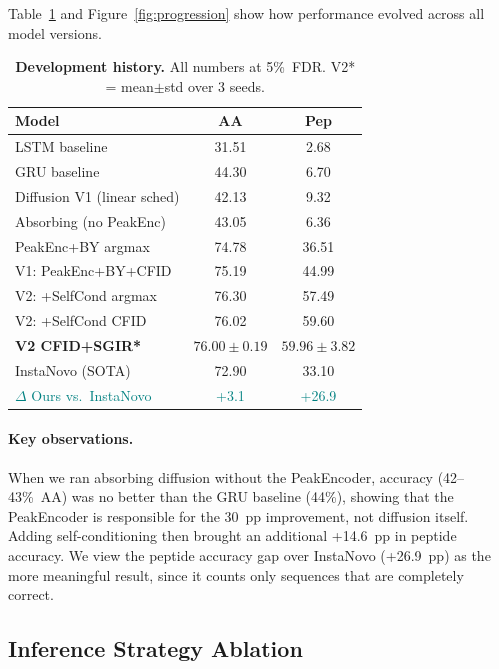 \documentclass[10pt,twocolumn]{article}
\begin{document}
Table~\ref{tab:main} and Figure~\ref{fig:progression} show how performance evolved across all model versions.

\begin{table}[t]
  \centering
  \caption{
    \textbf{Development history.}
    All numbers at 5\%~FDR.
    V2* = mean$\pm$std over 3 seeds.
  }
  \label{tab:main}
  \setlength{\tabcolsep}{4pt}
  \small
  \begin{tabular}{lcc}
    \toprule
    Model & AA & Pep \\
    \midrule
    LSTM baseline               & 31.51 & 2.68  \\
    GRU baseline                & 44.30 & 6.70  \\
    Diffusion V1 (linear sched) & 42.13 & 9.32  \\
    Absorbing (no PeakEnc)      & 43.05 & 6.36  \\
    \midrule
    PeakEnc+BY argmax           & 74.78 & 36.51 \\
    V1: PeakEnc+BY+CFID         & 75.19 & 44.99 \\
    \midrule
    V2: +SelfCond argmax        & 76.30 & 57.49 \\
    V2: +SelfCond CFID          & 76.02 & 59.60 \\
    \rowcolor{green!10}
    \textbf{V2 CFID+SGIR*}      & $76.00{\pm}0.19$ & $59.96{\pm}3.82$ \\
    \midrule
    InstaNovo (SOTA)            & 72.90 & 33.10 \\
    \textcolor{teal}{$\Delta$ Ours vs.\ InstaNovo} & \textcolor{teal}{+3.1} & \textcolor{teal}{+26.9} \\
    \bottomrule
  \end{tabular}
\end{table}

\paragraph{Key observations.}
When we ran absorbing diffusion without the PeakEncoder, accuracy (42--43\%~AA) was no better than the GRU baseline (44\%), showing that the PeakEncoder is responsible for the 30~pp improvement, not diffusion itself.
Adding self-conditioning then brought an additional +14.6~pp in peptide accuracy.
We view the peptide accuracy gap over InstaNovo (+26.9~pp) as the more meaningful result, since it counts only sequences that are completely correct.

\subsection{Inference Strategy Ablation}
\end{document}
